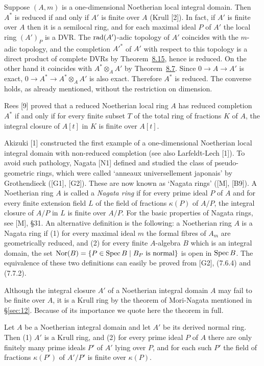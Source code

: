 Suppose $(A, m)$ is a one-dimensional Noetherian local integral domain. Then $A^*$
is reduced if and only if $A'$ is finite over $A$ (Krull [2]). In fact, if $A'$ is finite
over $A$ then it is a semilocal ring, and for each maximal ideal $P$ of $A'$ the
local ring $(A')_P$ is a DVR. The $\operatorname{rad}(A')$-adic topology of $A'$ coincides with the
$m$-adic topology, and the completion $A'^*$ of $A'$ with respect to this topology is
a direct product of complete DVRs by Theorem~\hyperref[thm:8.15]{8.15}, hence is reduced. On
the other hand it coincides with $A^* \otimes_A A'$ by Theorem~\hyperref[thm:8.7]{8.7}. Since
$0 \to A \to A'$ is exact, $0 \to A^* \to A^* \otimes_A A'$ is also exact. Therefore $A^*$ is
reduced. The converse holds, as already mentioned, without the restriction on
dimension.

Rees [9] proved that a reduced Noetherian local ring $A$ has reduced completion
$A^*$ if and only if for every finite subset $T$ of the total ring of fractions $K$
of $A$, the integral closure of $A[t]$ in $K$ is finite over $A[t]$.

Akizuki [1] constructed the first example of a one-dimensional Noetherian local
integral domain with non-reduced completion (see also Larfeldt-Lech [1]). To
avoid such pathology, Nagata [N1] defined and studied the class of
pseudo-geometric rings, which were called `anneaux universellement japonais'
by Grothendieck ([G1], [G2]). These are now known as `Nagata rings' ([M],
[B9]). A Noetherian ring $A$ is called a \emph{Nagata ring} if for every prime
ideal $P$ of $A$ and for every finite extension field $L$ of the field of fractions
$\kappa(P)$ of $A/P$, the integral closure of $A/P$ in $L$ is finite over $A/P$. For the
basic properties of Nagata rings, see [M], \S31. An alternative definition is the
following: a Noetherian ring $A$ is a Nagata ring if (1) for every maximal ideal
$m$ the formal fibres of $A_m$ are geometrically reduced, and (2) for every finite
$A$-algebra $B$ which is an integral domain, the set $\operatorname{Nor}(B) = \{P \in \operatorname{Spec} B \mid B_P
\text{ is normal}\}$ is open in $\operatorname{Spec} B$. The equivalence of these two definitions
can easily be proved from [G2], (7.6.4) and (7.7.2).

Although the integral closure $A'$ of a Noetherian integral domain $A$ may fail to
be finite over $A$, it is a Krull ring by the theorem of Mori-Nagata mentioned in
\S\ref{sec:12}. Because of its importance we quote here the theorem in full.

\begin{theorem}\label{thm:33.1}
Let $A$ be a Noetherian integral domain and let $A'$ be its derived normal ring.
Then (1) $A'$ is a Krull ring, and (2) for every prime ideal $P$ of $A$ there are
only finitely many prime ideals $P'$ of $A'$ lying over $P$, and for each such $P'$
the field of fractions $\kappa(P')$ of $A'/P'$ is finite over $\kappa(P)$.
\end{theorem}

